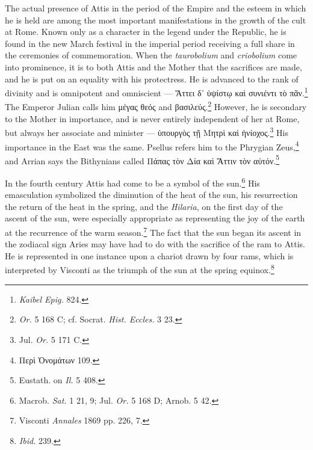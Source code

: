 \documentclass[a4paper, 11pt, oneside, polutonikogreek, french]{article}
\begin{document}
The actual presence of Attis in the period of the Empire and the esteem in which he is held are among the most important manifestations in the growth of the cult at Rome. Known only as a character in the legend under the Republic, he is found in the new March festival in the imperial period receiving a full share in the ceremonies of commemoration. When the \emph{taurobolium} and \emph{criobolium} come into prominence, it is to both Attis and the Mother that the sacrifices are made, and he is put on an equality with his protectress. He is advanced to the rank of divinity and is omnipotent and omniscient --- Ἄττει δ᾽ ὑψίστῳ καὶ συνιέντι τὸ πᾶν.\footnote{\emph{Kaibel Epig.} 824.} The Emperor Julian calls him μέγας θεός and βασιλεύς.\footnote{\emph{Or.} 5 168 C; cf. Socrat. \emph{Hist. Eccles.} 3 23.} However, he is secondary to the Mother in importance, and is never entirely independent of her at Rome, but always her associate and minister --- ὑπουργὸς τῇ Μητρὶ καὶ ἡνίοχος.\footnote{Jul. \emph{Or.} 5 171 C.} His importance in the East was the same. Psellus refers him to the Phrygian Zeus,\footnote{Περὶ Ὀνομάτων 109.} and Arrian says the Bithynians called Πάπας τὸν Δία καὶ Ἄττιν τὸν αὐτόν.\footnote{Eustath. on \emph{Il.} 5 408.}

In the fourth century Attis had come to be a symbol of the sun.\footnote{Macrob. \emph{Sat.} 1 21, 9; Jul. \emph{Or.} 5 168 D; Arnob. 5 42.} His emasculation symbolized the diminution of the heat of the sun, his resurrection the return of the heat in the spring, and the \emph{Hilaria}, on the first day of the ascent of the sun, were especially appropriate as representing the joy of the earth at the recurrence of the warm season.\footnote{Visconti \emph{Annales} 1869 pp. 226, 7.} The fact that the sun began its ascent in the zodiacal sign Aries may have had to do with the sacrifice of the ram to Attis. He is represented in one instance upon a chariot drawn by four rams, which is interpreted by Visconti as the triumph of the sun at the spring equinox.\footnote{\emph{Ibid.} 239.}
\end{document}
